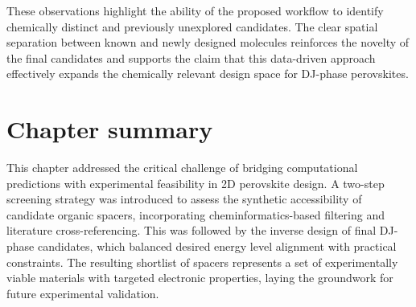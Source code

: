 These observations highlight the ability of the proposed workflow to identify chemically distinct and previously unexplored candidates. The clear spatial separation between known and newly designed molecules reinforces the novelty of the final candidates and supports the claim that this data-driven approach effectively expands the chemically relevant design space for DJ-phase perovskites.




\section{Chapter summary}

This chapter addressed the critical challenge of bridging computational predictions with experimental feasibility in 2D perovskite design. A two-step screening strategy was introduced to assess the synthetic accessibility of candidate organic spacers, incorporating cheminformatics-based filtering and literature cross-referencing. This was followed by the inverse design of final DJ-phase candidates, which balanced desired energy level alignment with practical constraints. The resulting shortlist of spacers represents a set of experimentally viable materials with targeted electronic properties, laying the groundwork for future experimental validation.
